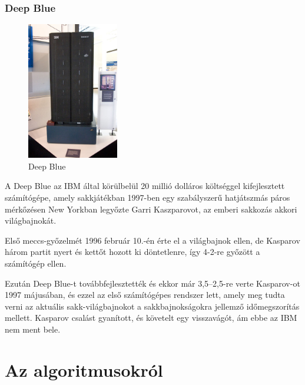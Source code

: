 \documentclass[twoside, a4paper, 12pt]{article}
\begin{document}
\subsubsection{Deep Blue}
\begin{figure}
	\caption{Deep Blue}
	\label{fig:deepblue}
	\includegraphics[width=4.0cm]{img/deepblue.jpg}
\end{figure}
A Deep Blue az IBM által körülbelül 20 millió dolláros költséggel kifejlesztett számítógépe, amely sakkjátékban 1997-ben egy szabályszerű hatjátszmás páros mérkőzésen New Yorkban legyőzte Garri Kaszparovot, az emberi sakkozás akkori világbajnokát.

Első meccs-győzelmét 1996 február 10.-én érte el a világbajnok ellen, de Kasparov három partit nyert és kettőt hozott ki döntetlenre, így 4-2-re győzött a számítógép ellen.

Ezután Deep Blue-t továbbfejlesztették és ekkor már 3,5–2,5-re verte Kasparov-ot 1997 májusában, és ezzel az első számítógépes rendszer lett, amely meg tudta verni az aktuális sakk-világbajnokot a sakkbajnokságokra jellemző időmegszorítás mellett. Kasparov csalást gyanított, és követelt egy visszavágót, ám ebbe az IBM nem ment bele. \cite{DeepBlueHu}\cite{DeepBlueEn}

\section{Az algoritmusokról}
\end{document}
